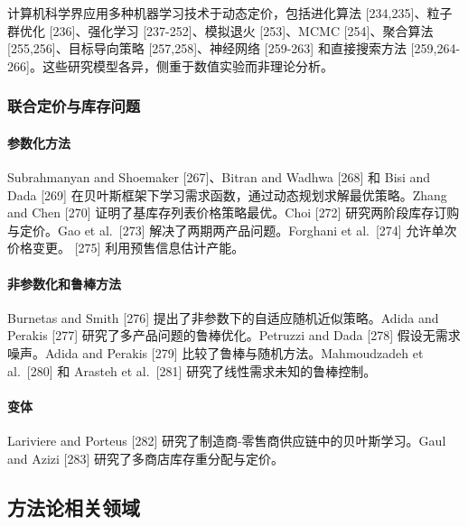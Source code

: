计算机科学界应用多种机器学习技术于动态定价，包括进化算法 {[}234,235{]}、粒子群优化 {[}236{]}、强化学习 {[}237-252{]}、模拟退火 {[}253{]}、MCMC {[}254{]}、聚合算法 {[}255,256{]}、目标导向策略 {[}257,258{]}、神经网络 {[}259-263{]} 和直接搜索方法 {[}259,264-266{]}。这些研究模型各异，侧重于数值实验而非理论分析。

\subsubsection{联合定价与库存问题}\label{joint-pricing-and-inventory-problems}

\paragraph{参数化方法}\label{parametric-approaches}

Subrahmanyan and Shoemaker {[}267{]}、Bitran and Wadhwa {[}268{]} 和 Bisi and Dada {[}269{]} 在贝叶斯框架下学习需求函数，通过动态规划求解最优策略。Zhang and Chen {[}270{]} 证明了基库存列表价格策略最优。Choi {[}272{]} 研究两阶段库存订购与定价。Gao et al.~{[}273{]} 解决了两期两产品问题。Forghani et al.~{[}274{]} 允许单次价格变更。{ [}275{]} 利用预售信息估计产能。

\paragraph{非参数化和鲁棒方法}\label{nonparametric-and-robust-approaches}

Burnetas and Smith {[}276{]} 提出了非参数下的自适应随机近似策略。Adida and Perakis {[}277{]} 研究了多产品问题的鲁棒优化。Petruzzi and Dada {[}278{]} 假设无需求噪声。Adida and Perakis {[}279{]} 比较了鲁棒与随机方法。Mahmoudzadeh et al.~{[}280{]} 和 Arasteh et al.~{[}281{]} 研究了线性需求未知的鲁棒控制。

\paragraph{变体}\label{variants}

Lariviere and Porteus {[}282{]} 研究了制造商-零售商供应链中的贝叶斯学习。Gaul and Azizi {[}283{]} 研究了多商店库存重分配与定价。



\subsection{方法论相关领域}\label{methodologically-related-areas}

